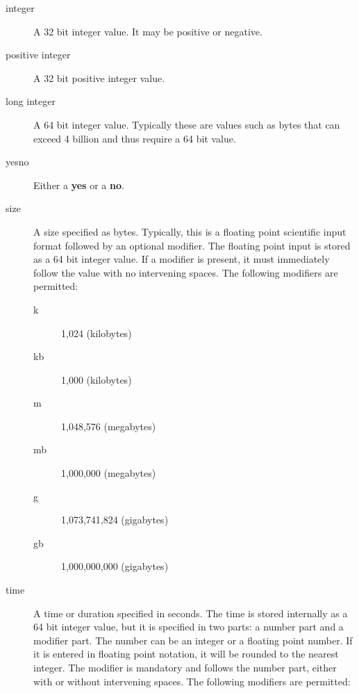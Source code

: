 \begin{description}
\item [integer]
   A 32 bit integer value. It may be positive or negative.

\item [positive integer]
   A 32 bit positive integer value.

\item [long integer]
   A 64 bit integer value. Typically these  are values such as bytes that can
exceed 4 billion and thus  require a 64 bit value.

\item [yes{\textbar}no]
   Either a {\bf yes} or a {\bf no}.

\label{Size1}
\item [size]
A size specified as bytes. Typically, this is  a floating point scientific
input format followed by an optional modifier. The  floating point input is
stored as a 64 bit integer value.  If a modifier is present, it must
immediately follow the  value with no intervening spaces. The following
modifiers are permitted:

\begin{description}
\item [k]
   1,024 (kilobytes)

\item [kb]
   1,000 (kilobytes)

\item [m]
   1,048,576 (megabytes)

\item [mb]
   1,000,000 (megabytes)

\item [g]
   1,073,741,824 (gigabytes)

\item [gb]
   1,000,000,000 (gigabytes)
\end{description}

\label{Time}
\item [time]
A time or duration specified in seconds.  The time is stored internally as
a 64 bit integer value, but it is specified in two parts: a number part and
a modifier part.  The number can be an integer or a floating point number.
If it is entered in floating point notation, it will be rounded to the
nearest integer.  The modifier is mandatory and follows the number part,
either with or without intervening spaces.  The following modifiers are
permitted:


\end{description}
